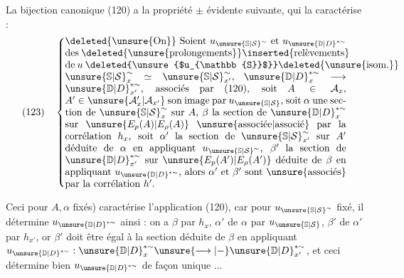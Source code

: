  La bijection canonique (120) a la propriété
$\pm$ évidente suivante, qui la caractérise :
\[
(123)\quad\left\{\vcenter{\hbox{\begin{minipage}{0.82\linewidth}
\deleted{\unsure{On}} Soient $u_{\unsure{\mathbb{S}|\mathcal{S}}^{\sim}}$ et
$u_{\unsure{\mathbb{D}|D}^{*\sim}}$ des
\deleted{\unsure{prolongements}}\inserted{relèvements} de $u$
\deleted{\unsure{$u_{\mathbb{S}}$}}\deleted{\unsure{isom.}}
$\unsure{\mathbb{S}|\mathcal{S}}_x^{\sim}\simeq\unsure{\mathbb{S}|\mathcal{S}}_{x'}^{\sim}$,
$\unsure{\mathbb{D}|D}_x^{*\sim}\longrightarrow\unsure{\mathbb{D}|D}_{x'}^{*\sim}$,
associés par (120), soit $A\in\mathcal{A}_x$,
$A'\in\unsure{\mathcal{A}'_x|\mathcal{A}_{x'}}$ son image par
$u_{\unsure{\mathbb{S}|\mathcal{S}}}$, soit $\alpha$ une section de $\unsure{\mathbb{S}|\mathcal{S}}_x^{\sim}$ sur $A$,
$\beta$ la section de $\unsure{\mathbb{D}|D}_x^{*\sim}$ sur
$\unsure{E_p(A)|E_\rho(A)}$ \unsure{associée|associé} par la corrélation
$h_x$, soit $\alpha'$ la section de $\unsure{\mathbb{S}|\mathcal{S}}_{x'}^{\sim}$ sur $A'$
déduite de $\alpha$ en appliquant $u_{\unsure{\mathbb{S}|\mathcal{S}}^{\sim}}$,
$\beta'$ la section de $\unsure{\mathbb{D}|D}_{x'}^{*\sim}$ sur
$\unsure{E_p(A')|E_\rho(A')}$ déduite de $\beta$ en appliquant
$u_{\unsure{\mathbb{D}|D}^{*\sim}}$, alors $\alpha'$ et $\beta'$ sont
\unsure{associés} par la corrélation $h'$.
\end{minipage}}}\right.
\]


Ceci  \unsure{(}pour $A,\alpha$ fixés)
caractérise l'application  (120), car pour
$u_{\unsure{\mathbb{S}|\mathcal{S}}^{\sim}}$ fixé, il détermine $u_{\unsure{\mathbb{D}|D}^{*\sim}}$ ainsi :
on a $\beta$ par $h_x$, $\alpha'$  de $\alpha$ par
$u_{\unsure{\mathbb{S}|\mathcal{S}}}$, $\beta'$  de $\alpha'$ par $h_{x'}$,
or $\beta'$ doit être égal à la section déduite de $\beta$ en appliquant
$u_{\unsure{\mathbb{D}|D}^{*\sim}}:\unsure{\mathbb{D}|D}_x^{*\sim}
\unsure{\longrightarrow|-}\unsure{\mathbb{D}|D}_{x'}^{*\sim}$,
et ceci détermine bien $u_{\unsure{\mathbb{D}|D}^{*\sim}}$ de façon unique ...

